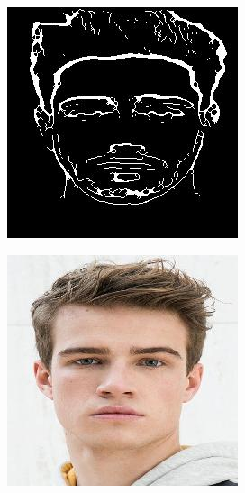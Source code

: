 \documentclass{70_styles/svproc}
\begin{document}
\begin{figure}
\begin{minipage}[b]{0.47\textwidth}
\begin{subfigure}[b]{0.4\textwidth}
     \end{subfigure}
     \begin{subfigure}[b]{0.4\textwidth}
         \centering
         \includegraphics[width=\textwidth]{70_figures/thinned-1 (1).jpg}
     \end{subfigure}
    \par\medskip
     \begin{subfigure}[b]{0.4\textwidth}
         \centering
         \includegraphics[width=\textwidth]{70_figures/1 (107).jpg}

\end{subfigure}
\end{minipage}
\end{figure}
\end{document}
